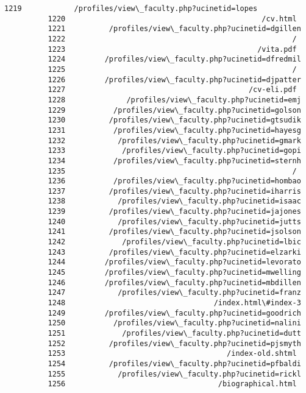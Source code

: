 \documentclass[11pt]{article}
\begin{document}
\begin{Verbatim}[commandchars=\\\{\}]
          1219            /profiles/view\_faculty.php?ucinetid=lopes
          1220                                             /cv.html
          1221          /profiles/view\_faculty.php?ucinetid=dgillen
          1222                                                    /
          1223                                            /vita.pdf
          1224         /profiles/view\_faculty.php?ucinetid=dfredmil
          1225                                                    /
          1226         /profiles/view\_faculty.php?ucinetid=djpatter
          1227                                          /cv-eli.pdf
          1228              /profiles/view\_faculty.php?ucinetid=emj
          1229           /profiles/view\_faculty.php?ucinetid=golson
          1230          /profiles/view\_faculty.php?ucinetid=gtsudik
          1231           /profiles/view\_faculty.php?ucinetid=hayesg
          1232            /profiles/view\_faculty.php?ucinetid=gmark
          1233             /profiles/view\_faculty.php?ucinetid=gopi
          1234           /profiles/view\_faculty.php?ucinetid=sternh
          1235                                                    /
          1236           /profiles/view\_faculty.php?ucinetid=hombao
          1237          /profiles/view\_faculty.php?ucinetid=iharris
          1238            /profiles/view\_faculty.php?ucinetid=isaac
          1239          /profiles/view\_faculty.php?ucinetid=jajones
          1240            /profiles/view\_faculty.php?ucinetid=jutts
          1241          /profiles/view\_faculty.php?ucinetid=jsolson
          1242             /profiles/view\_faculty.php?ucinetid=lbic
          1243          /profiles/view\_faculty.php?ucinetid=elzarki
          1244         /profiles/view\_faculty.php?ucinetid=levorato
          1245         /profiles/view\_faculty.php?ucinetid=mwelling
          1246         /profiles/view\_faculty.php?ucinetid=mbdillen
          1247            /profiles/view\_faculty.php?ucinetid=franz
          1248                                  /index.html\#index-3
          1249         /profiles/view\_faculty.php?ucinetid=goodrich
          1250           /profiles/view\_faculty.php?ucinetid=nalini
          1251             /profiles/view\_faculty.php?ucinetid=dutt
          1252          /profiles/view\_faculty.php?ucinetid=pjsmyth
          1253                                     /index-old.shtml
          1254          /profiles/view\_faculty.php?ucinetid=pfbaldi
          1255            /profiles/view\_faculty.php?ucinetid=rickl
          1256                                   /biographical.html

\end{Verbatim}
\end{document}
